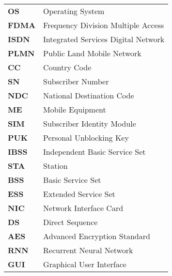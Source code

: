 \begin{tabular}{p{3cm}l}
\textbf{OS}			& Operating System\\
\textbf{FDMA}		& Frequency Division Multiple Access \\
\textbf{ISDN}		& Integrated Services Digital Network \\
 \textbf{PLMN}		& Public Land Mobile Network \\
 \textbf{CC}		& Country Code \\
\textbf{SN}			& Subscriber Number \\
\textbf{NDC}		& National Destination Code\\ 
\textbf{ME}			& Mobile Equipment \\
\textbf{SIM}		& Subscriber Identity Module\\ 
\textbf{PUK}		& Personal Unblocking Key\\
\textbf{IBSS}		& Independent Basic Service Set\\ 
\textbf{STA}		& Station \\
\textbf{BSS}		& Basic Service Set \\
\textbf{ESS}		& Extended Service Set \\
\textbf{NIC}		& Network Interface Card \\
\textbf{DS}			& Direct Sequence \\
\textbf{AES}		& Advanced Encryption Standard \\
\textbf{RNN}		& Recurrent Neural Network\\
\textbf{GUI}		& Graphical User Interface\\
\end{tabular}

